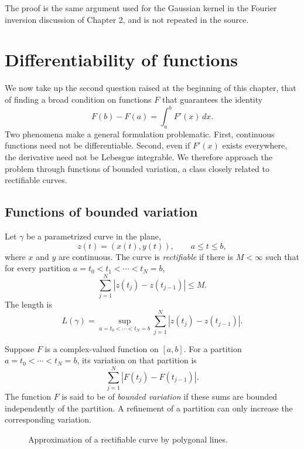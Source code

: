 \documentclass[11pt,openany]{book}
\begin{document}
The proof is the same argument used for the Gaussian kernel in the Fourier inversion discussion of Chapter 2, and is not repeated in the source.

\section{Differentiability of functions}

We now take up the second question raised at the beginning of this chapter, that of finding a broad condition on functions $F$ that guarantees the identity
\begin{equation}
F(b)-F(a)=\int_a^b F'(x)\,dx.
\tag{6}
\end{equation}
Two phenomena make a general formulation problematic. First, continuous functions need not be differentiable. Second, even if $F'(x)$ exists everywhere, the derivative need not be Lebesgue integrable. We therefore approach the problem through functions of bounded variation, a class closely related to rectifiable curves.

\subsection{Functions of bounded variation}

Let $\gamma$ be a parametrized curve in the plane,
\[
z(t)=(x(t),y(t)),\qquad a\le t\le b,
\]
where $x$ and $y$ are continuous. The curve is \emph{rectifiable} if there is $M<\infty$ such that for every partition
$a=t_0<t_1<\cdots<t_N=b$,
\begin{equation}
\sum_{j=1}^N|z(t_j)-z(t_{j-1})|\le M.
\tag{7}
\end{equation}
The length is
\[
L(\gamma)=\sup_{a=t_0<\cdots<t_N=b}
\sum_{j=1}^N|z(t_j)-z(t_{j-1})|.
\]

Suppose $F$ is a complex-valued function on $[a,b]$. For a partition $a=t_0<\cdots<t_N=b$, its variation on that partition is
\[
\sum_{j=1}^N|F(t_j)-F(t_{j-1})|.
\]
The function $F$ is said to be of \emph{bounded variation} if these sums are bounded independently of the partition. A refinement of a partition can only increase the corresponding variation.

\begin{figure}[ht]
\centering
{}
\caption{Approximation of a rectifiable curve by polygonal lines.}
\end{figure}
\end{document}
